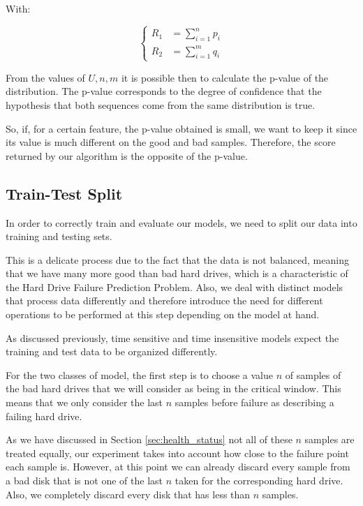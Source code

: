 With:

\begin{equation}
  \begin{cases}
    R_1 &= \sum_{i=1}^{n}p_i \\
    R_2 &= \sum_{i=1}^{m}q_i
  \end{cases}
\end{equation}

From the values of $U, n, m$ it is possible then to calculate the p-value of the distribution.
The p-value corresponds to the degree of confidence that the hypothesis that both sequences come from the same distribution is true.

So, if, for a certain feature, the p-value obtained is small, we want to keep it since its value is much different on the good and bad samples.
Therefore, the score returned by our algorithm is the opposite of the p-value.

\subsection{Train-Test Split}\label{subsec:train_test_split}

In order to correctly train and evaluate our models, we need to split our data into training and testing sets.

This is a delicate process due to the fact that the data is not balanced, meaning that we have many more good than bad hard drives, which is a characteristic of the Hard Drive Failure Prediction Problem.
Also, we deal with distinct models that process data differently and therefore introduce the need for different operations to be performed at this step depending on the model at hand.

As discussed previously, time sensitive and time insensitive models expect the training and test data to be organized differently.

For the two classes of model, the first step is to choose a value $n$ of samples of the bad hard drives that we will consider as being in the critical window.
This means that we only consider the last $n$ samples before failure as describing a failing hard drive.

As we have discussed in Section \ref{sec:health_status} not all of these $n$ samples are treated equally, our experiment takes into account how close to the failure point each sample is.
However, at this point we can already discard every sample from a bad disk that is not one of the last $n$ taken for the corresponding hard drive.
Also, we completely discard every disk that has less than $n$ samples.


